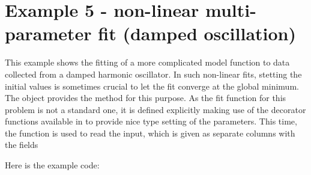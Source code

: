 \documentclass[a4paper,10pt,english]{sphinxmanual}
\begin{document}
\section{Example 5 - non-linear multi-parameter fit (damped oscillation)}
\label{index:example-5-non-linear-multi-parameter-fit-damped-oscillation}
This example shows the fitting of a more complicated model function
to data collected from a damped harmonic oscillator. In such
non-linear fits, stetting the initial values is sometimes crucial
to let the fit converge at the global minimum. The {\hyperref[index:kafe.fit.Fit]{}}
object provides the method {\hyperref[index:kafe.fit.Fit.set_parameters]{}} for this
purpose. As the fit function for this problem is not a standard one, it is
defined explicitly making use of the decorator functions available in
 to provide nice type setting of the parameters. This time,
the function {\hyperref[index:kafe.file_tools.parse_column_data]{}} is used to read
the input, which is given as separate columns with the fields
\begin{quote}

\end{quote}

Here is the example code:
\end{document}
